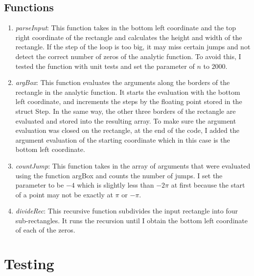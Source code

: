 \documentclass[11pt,reqno,oneside,a4paper]{article}
\begin{document}
\subsection{Functions}
	\begin{enumerate}
		\item \emph{parseInput}: 
		This function takes in the bottom left coordinate and the top right coordinate of the rectangle and calculates the height and width of the rectangle. 
		If the step of the loop is too big, it may miss certain jumps and not detect the correct number of zeros of the analytic function.
		To avoid this, I tested the function with unit tests and set the parameter of $n$ to $2000.$ 
		
		\item \emph{argBox}:
		This function evaluates the arguments along the borders of the rectangle in the analytic function. 
		It starts the evaluation with the bottom left coordinate, and increments the steps by the floating point stored in the struct Step. 
		In the same way, the other three borders of the rectangle are evaluated and stored into the resulting array. 
		To make sure the argument evaluation was closed on the rectangle, at the end of the code, I added the argument evaluation of the starting coordinate which in this case is the bottom left coordinate.
		
		\item \emph{countJump}: 
		This function takes in the array of arguments that were evaluated using the function argBox and counts the number of jumps.
		I set the parameter to be $-4$ which is slightly less than $-2\pi$ at first because the start of a point may not be exactly at $\pi$ or $-\pi.$ 
		
		\item \emph{divideRec}:
		This recursive function subdivides the input rectangle into four sub-rectangles.
		It runs the recursion until I obtain the bottom left coordinate of each of the zeros. 
		
		
	\end{enumerate}

\section{Testing}
\end{document}

